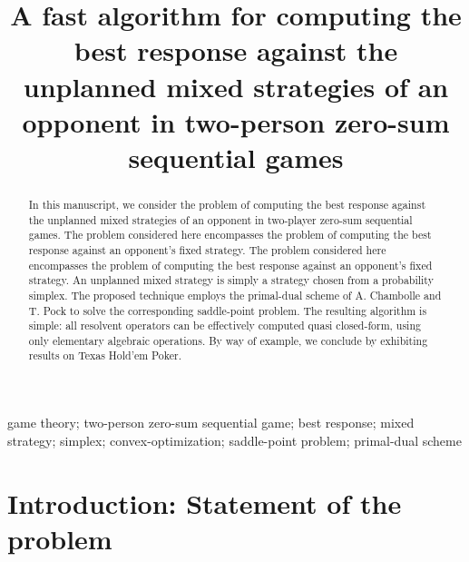 \documentclass[a4paper,10pt,journal]{IEEEtran}
\begin{document}
\title{A fast algorithm for computing the best response against the unplanned mixed strategies of an opponent in two-person zero-sum sequential games}


\author{}


\maketitle

\begin{abstract}
% 
In this manuscript, we consider the problem of computing the best response against the  unplanned mixed strategies of an opponent
in two-player zero-sum sequential games. The problem considered here encompasses the problem of computing the best response against an opponent's fixed strategy.
The problem considered here encompasses the problem of computing the best response against an opponent's fixed strategy.
An unplanned mixed strategy is simply a strategy chosen from a probability simplex.
The proposed technique employs the primal-dual scheme of A. Chambolle and T. Pock to solve the corresponding saddle-point problem.
The resulting algorithm is simple: all resolvent operators can be effectively computed quasi closed-form, using only elementary algebraic operations.
By way of example, we conclude by exhibiting results on Texas Hold'em Poker.
\end{abstract}


\begin{IEEEkeywords}
  game theory; two-person zero-sum sequential game; best response; mixed strategy; simplex; convex-optimization; saddle-point problem; primal-dual scheme
\end{IEEEkeywords}

\section{Introduction: Statement of the problem}
\label{sec:intro}
\end{document}
